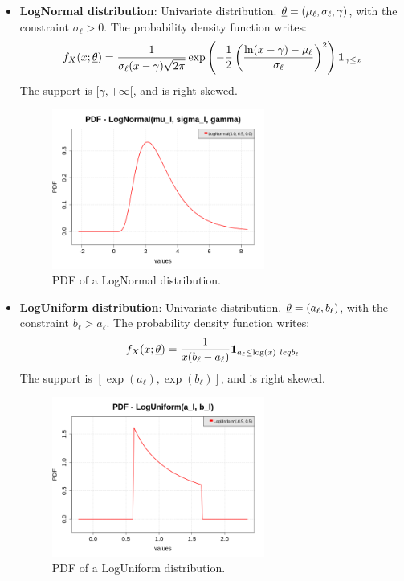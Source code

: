 {\begin{itemize}
\item {\bf LogNormal distribution}: Univariate distribution. ${\underline{\theta}} = \left(\mu_\ell,\sigma_\ell,\gamma \right)$, with the constraint $\sigma_\ell>0$. The probability density function writes:
\begin{equation}
f_X(x;{\underline{\theta}}) = \frac{1}{\sigma_\ell (x-\gamma) \sqrt{2\pi}} \exp \left( -\frac{1}{2} \left( \frac{\textrm{ln}(x-\gamma)-\mu_\ell}{\sigma_\ell}  \right)^2 \right) \mathbf{1}_{\gamma \leq x}
\end{equation}
The support is $[\gamma,+\infty[$, and is right skewed.

\begin{figure}[H]
\begin{center}
\includegraphics[width=7cm]{Figures/pdf_LogNormal.png}
\caption{PDF of a  LogNormal distribution.}
\end{center}
\end{figure}


\item {\bf LogUniform distribution}: Univariate distribution. ${\underline{\theta}} = \left(a_\ell,b_\ell\right)$, with the constraint $b_\ell>a_\ell$. The probability density function writes:
\begin{equation}
f_X(x;{\underline{\theta}}) = \frac{1}{x(b_\ell-a_\ell)}\mathbf{1}_{a_\ell \leq \log(x) \ leq b_\ell}
\end{equation}
The support is $[\exp(a_\ell),\exp(b_\ell)]$, and is right skewed.

\begin{figure}[H]
\begin{center}
\includegraphics[width=7cm]{Figures/pdf_LogUniform.png}
\caption{PDF of a  LogUniform distribution.}
\end{center}
\end{figure}


\end{itemize}}
